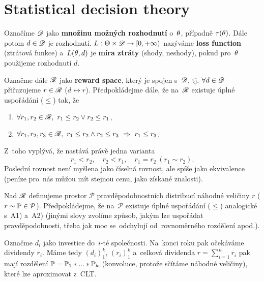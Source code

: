 \section{Statistical decision theory}

\begin{define}
	Označíme $\mathscr{D}$ jako \textbf{množinu možných rozhodnutí} o~$\theta$, případně $\tau(\theta)$. Dále potom $d\in\mathscr{D}$ je rozhodnutí. $L:\Theta\times\mathscr{D}\to[0,+\infty)$ nazýváme \textbf{loss function} (ztrátová funkce) a~$L(\theta,d)$ je \textbf{míra ztráty} (shody, neshody), pokud pro~$\theta$ použijeme rozhodnutí $d$.
	
	Označme dále $\mathscr{R}$ jako \textbf{reward space}, který je spojen s~$\mathscr{D}$, tj. $\forall d\in\mathscr{D}$ přiřazujeme $r\in\mathscr{R}$ ($d\leftrightarrow r$). Předpokládejme dále, že na~$\mathscr{R}$ existuje úplné uspořádání ($\leq$) tak, že \begin{enumerate}[{A}1)]
		\item $\forall r_1,r_2\in\mathscr{R},~r_1\leq r_2 \vee r_2\leq r_1$,
		\item $\forall r_1,r_2,r_3\in\mathscr{R},~r_1\leq r_2 \wedge r_2\leq r_3~\Rightarrow~r_1\leq r_3$. 
	\end{enumerate}Z~toho vyplývá, že nastává právě jedna varianta
	$$ r_1<r_2,\quad r_2<r_1,\quad r_1=r_2~(r_1\sim r_2).$$
	Poslední rovnost není myšlena jako číselná rovnost, ale spíše jako ekvivalence (peníze pro~nás můžou mít stejnou cenu, jako získané znalosti).
	
	Nad $\mathscr{R}$ definujeme prostor $\mathcal{P}$ pravděpodobnostních distribucí náhodné veličiny $r$ ($r\sim\mathbb{P}\in\mathcal{P}$). Předpokládejme, že na~$\mathcal{P}$ existuje úplné uspořádání ($\leq$) analogické s~A1) a~A2) (jinými slovy zvolíme způsob, jakým lze uspořádat pravděpodobnosti, třeba jak moc se~odchylují od~rovnoměrného rozdělení apod.).
\end{define}

\begin{example}[Motivace] 
	Označme $d_i$ jako investice do~$i$-té společnosti. Na~konci roku pak očekáváme dividendy $r_i$. Máme tedy $(d_i)_1^k$, $(r_i)_1^k$ a~celková dividenda $r=\sum_{i=1}^n r_i$ pak mají rozdělení $\mathbb{P}=\mathbb{P}_1\ast...\ast\mathbb{P}_k$ (konvoluce, protože sčítáme náhodné veličiny), které lze aproximovat z~CLT.
\end{example}

